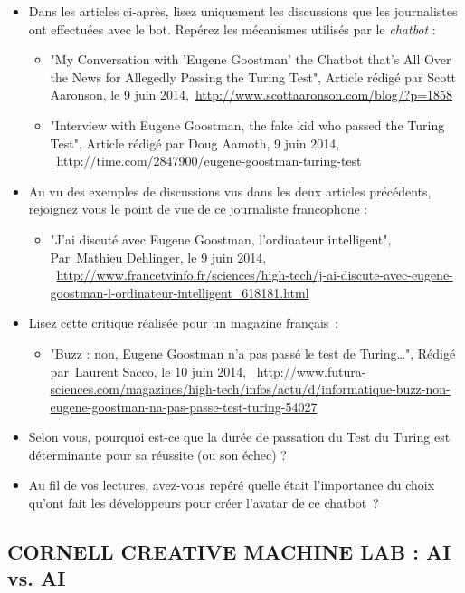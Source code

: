 \begin{itemize}
  \item Dans les articles ci-après, lisez uniquement les discussions que les journalistes ont effectuées avec le bot. Repérez les mécanismes utilisés par le \textit{chatbot} :
  \begin{itemize}
    \item "My Conversation with 'Eugene Goostman' the Chatbot that's All Over the News for Allegedly Passing the Turing Test", Article rédigé par Scott Aaronson, le 9 juin 2014,~\url{http://www.scottaaronson.com/blog/?p=1858}
    \item "Interview with Eugene Goostman, the fake kid who passed the Turing Test", Article rédigé par Doug Aamoth, 9 juin 2014, ~\url{http://time.com/2847900/eugene-goostman-turing-test}
  \end{itemize}
  \item Au vu des exemples de discussions vus dans les deux articles précédents, rejoignez vous le point de vue de ce journaliste francophone :
  \begin{itemize}
    \item "J'ai discuté avec Eugene Goostman, l'ordinateur intelligent", Par Mathieu Dehlinger, le 9 juin 2014, ~\url{http://www.francetvinfo.fr/sciences/high-tech/j-ai-discute-avec-eugene-goostman-l-ordinateur-intelligent_618181.html}
  \end{itemize}
  \item Lisez cette critique réalisée pour un magazine français :
  \begin{itemize}
    \item "Buzz : non, Eugene Goostman n'a pas passé le test de Turing\dots", Rédigé par Laurent Sacco, le 10 juin 2014, ~\url{http://www.futura-sciences.com/magazines/high-tech/infos/actu/d/informatique-buzz-non-eugene-goostman-na-pas-passe-test-turing-54027}
  \end{itemize}
  \item Selon vous, pourquoi est-ce que la durée de passation du Test du Turing est déterminante pour sa réussite (ou son échec) ?
  \item Au fil de vos lectures, avez-vous repéré quelle était l'importance du choix qu'ont fait les développeurs pour créer l'avatar de ce chatbot ?
\end{itemize}


\subsection{CORNELL CREATIVE MACHINE LAB : AI vs. AI}


